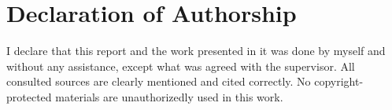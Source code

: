 \chapter*{Declaration of Authorship}
\label{ch:declaration_of_authorship}
I declare that this report and the work presented in it was done by myself and without any assistance, except what was agreed with the 
supervisor. All consulted sources are clearly mentioned and cited correctly. 
No copyright-protected materials are unauthorizedly used in this work.

\vspace{6cm}
